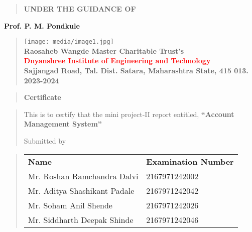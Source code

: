 \documentclass[12pt]{report}
\begin{document}
	\vspace{0.5cm}
	\begin{quote}
		\centering
		\large
		\textbf{UNDER THE GUIDANCE OF}
	\end{quote}
	\textbf{Prof. P. M. Pondkule}
	\vspace{0.5cm}
	\begin{quote}
		\centering
		\texttt{[image: media/image1.jpg]}\\
		\vspace{0.5cm}
		\bfseries
		\textbf{Raosaheb Wangde Master Charitable Trust's}\\
		\textcolor{red}{Dnyanshree Institute of Engineering and Technology}\\
		Sajjangad Road, Tal. Dist. Satara, Maharashtra State, 415 013.\\ 2023-2024
	\end{quote}
	\vspace{0.5cm}
	
	\newpage
	
	
	
	
	\begin{quote}
		\centering
		\LARGE
		\textbf{Certificate}
	\end{quote}
	
	\begin{quote}
		\normalsize
		\centering
		This is to certify that the mini project-II report entitled, \textbf{``Account Management System''}
		
		Submitted by\\[1ex]
	\end{quote}
	\vspace{0.5cm}
	\begin{quote}
		\centering
		\begin{table}[ht]
			\centering
		\begin{center}
			\begin{tabular}{l l}
				
				\!
				\bfseries \hspace{1.5mm} Name & \bfseries Examination Number \\
			
				Mr. Roshan Ramchandra Dalvi & 2167971242002 \\
				Mr. Aditya Shashikant Padale & 2167971242042 \\
				Mr. Soham Anil Shende & 2167971242026 \\
				Mr. Siddharth Deepak Shinde & 2167971242046 \\
				
			\end{tabular}
		  \end{center}
		\end{table}
	\end{quote}
	
\end{document}
